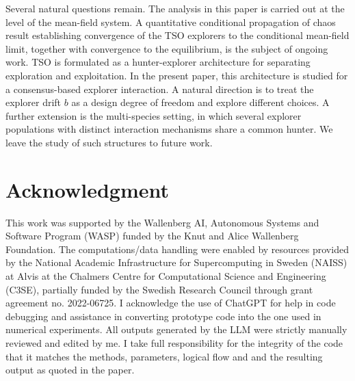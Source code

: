 \documentclass{article}
\numberwithin{equation}{section}
\begin{document}
Several natural questions remain. The analysis in this paper is carried out at the level of the mean-field system. A quantitative conditional propagation of chaos result establishing convergence of the TSO explorers to the conditional mean-field limit, together with convergence to the equilibrium, is the subject of ongoing work. TSO is formulated as a hunter-explorer architecture for separating exploration and exploitation. In the present paper, this architecture is studied for a consensus-based explorer interaction. A natural direction is to treat the explorer drift $b$ as a design degree of freedom and explore different choices. A further extension is the multi-species setting, in which several explorer populations with distinct interaction mechanisms share a common hunter. We leave the study of such structures to future work.




\section*{Acknowledgment}
This work was supported by the Wallenberg AI, Autonomous Systems and Software Program (WASP) funded by the Knut and Alice Wallenberg Foundation. The computations/data handling were enabled by resources provided by the National Academic Infrastructure for Supercomputing in Sweden (NAISS) at Alvis at the Chalmers Centre for Computational Science and Engineering (C3SE), partially funded by the Swedish Research Council through grant agreement no. 2022-06725. I acknowledge the use of ChatGPT for help in code debugging and assistance in converting prototype code into the one used in numerical experiments. All outputs generated by the LLM were strictly manually reviewed and edited by me. I take full responsibility for the integrity of the code that it matches the methods, parameters, logical flow and and the resulting output as quoted in the paper.


\small





\appendix
\end{document}
